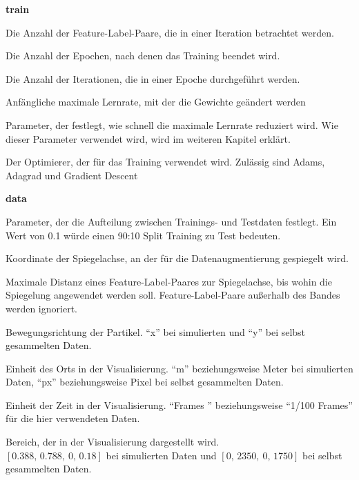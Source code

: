 \newpage
{\Large \sffamily \textbf{train}}

\begin{description}[leftmargin=!,labelwidth=\widthof{\bfseries separatorPosition}, labelindent=0.5cm]
    \item[batchSize] Die Anzahl der Feature-Label-Paare, die in einer Iteration betrachtet werden.
    \item[epochs] Die Anzahl der Epochen, nach denen das Training beendet wird.
    \item[stepsPerEpoch] Die Anzahl der Iterationen, die in einer Epoche durchgeführt werden.  
    \item[learningRate] Anfängliche maximale Lernrate, mit der die Gewichte geändert werden
    \item[decaySteps] Parameter, der festlegt, wie schnell die maximale Lernrate reduziert wird. Wie dieser Parameter verwendet wird, wird im weiteren Kapitel erklärt.
    \item[optimizer] Der Optimierer, der für das Training verwendet wird. Zulässig sind Adams, Adagrad und Gradient Descent
\end{description}

\bigskip
{\Large \sffamily \textbf{data}}
\begin{description}[leftmargin=!,labelwidth=\widthof{\bfseries separatorPosition}, labelindent=0.5cm]
    \item[testSize] Parameter, der die Aufteilung zwischen Trainings- und Testdaten festlegt. Ein Wert von 0.1 würde einen 90:10 Split Training zu Test bedeuten.  
    \item[augmentMidpoint] Koordinate der Spiegelachse, an der für die Datenaugmentierung gespiegelt wird.
    \item[augmentRange] Maximale Distanz eines Feature-Label-Paares zur Spiegelachse, bis wohin die Spiegelung angewendet werden soll. Feature-Label-Paare außerhalb des Bandes werden ignoriert.
    \item[direction] Bewegungsrichtung der Partikel. ``x'' bei simulierten und ``y'' bei selbst gesammelten Daten.
    \item[unitLoc] Einheit des Orts in der Visualisierung. ``m'' beziehungsweise Meter bei simulierten Daten, ``px'' beziehungsweise Pixel bei selbst gesammelten Daten.
    \item[unitTime] Einheit der Zeit in der Visualisierung. ``Frames '' beziehungsweise ``1/100 Frames'' für die hier verwendeten Daten.
    \item[limits] Bereich, der in der Visualisierung dargestellt wird.\\ \([0.388, \, 0.788, \ 0, \, 0.18]\) bei simulierten Daten und \([0,\, 2350, \ 0, \, 1750]\) bei selbst gesammelten Daten.

\end{description}



